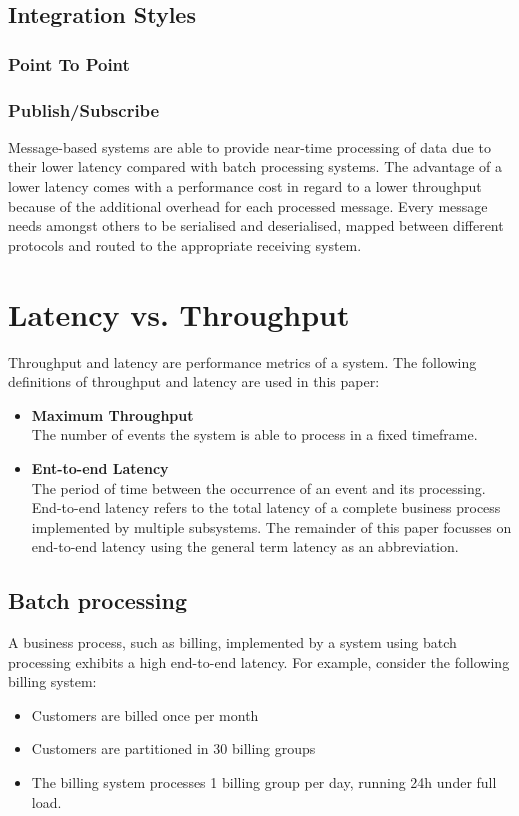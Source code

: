 \subsection{Integration Styles}

\subsubsection{Point To Point}

\subsubsection{Publish/Subscribe}

Message-based systems are able to provide near-time processing of data due to their lower latency compared with batch processing systems. The advantage of a lower latency comes with a performance cost in regard to a lower throughput because of the additional overhead for each processed message. Every message needs amongst others to be serialised and deserialised, mapped between different protocols and routed to the appropriate receiving system.

\section{Latency vs. Throughput}\label{sec:ch2_latency_throughput}
Throughput and latency are performance metrics of a system. The following definitions of throughput and latency are used in this paper:
\begin{itemize}
	\item \textbf{Maximum Throughput}\\
	The number of events the system is able to process in a fixed timeframe.
 	\item \textbf{Ent-to-end Latency}\\
	The period of time between the occurrence of an event and its processing. End-to-end latency refers to the total latency of a complete business process implemented by multiple subsystems. The remainder of this paper focusses on end-to-end latency using the general term latency as an abbreviation.
\end{itemize}
\subsection{Batch processing}
A business process, such as billing, implemented by a system using batch processing exhibits a high end-to-end latency. For example, consider the following billing system:
\begin{itemize}
	\item Customers are billed once per month
	\item Customers are partitioned in 30 billing groups
	\item The billing system processes 1 billing group per day, running 24h under full load.
\end{itemize}

